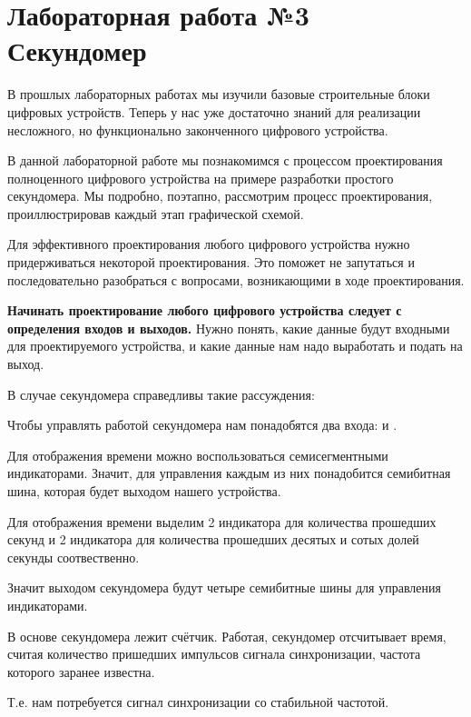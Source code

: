 \chapter{Лабораторная работа №3\\Секундомер} 

\par{В прошлых лабораторных работах мы изучили базовые строительные блоки цифровых устройств. Теперь у нас уже достаточно знаний для реализации несложного, но функционально законченного цифрового устройства.}

\par{В данной лабораторной работе мы познакомимся с процессом проектирования полноценного цифрового устройства на примере разработки простого секундомера. Мы подробно, поэтапно, рассмотрим процесс проектирования, проиллюстрировав каждый этап графической схемой.}

\par{Для эффективного проектирования любого цифрового устройства нужно придерживаться некоторой  проектирования. Это поможет не запутаться и последовательно разобраться с вопросами, возникающими в ходе проектирования.}

\par{\textbf{Начинать проектирование любого цифрового устройства следует с определения входов и выходов.} Нужно понять, какие данные будут входными для проектируемого устройства, и какие данные нам надо выработать и подать на выход.}

\vspace{4mm}
\par{В случае секундомера справедливы такие рассуждения:}
\par{Чтобы управлять работой секундомера нам понадобятся два входа:  и .}
\par{Для отображения времени можно воспользоваться семисегментными индикаторами. Значит, для управления каждым из них понадобится семибитная шина, которая будет выходом нашего устройства.}
\par{Для отображения времени выделим 2 индикатора для количества прошедших секунд и 2 индикатора для количества прошедших десятых и сотых долей секунды соотвественно.}
\par{Значит выходом секундомера будут четыре семибитные шины для управления индикаторами.}
\par{В основе секундомера лежит счётчик. Работая, секундомер отсчитывает время, считая количество пришедших импульсов сигнала синхронизации, частота которого заранее известна.}
\par{Т.е. нам потребуется сигнал синхронизации со стабильной частотой.}
\vspace{4mm}

